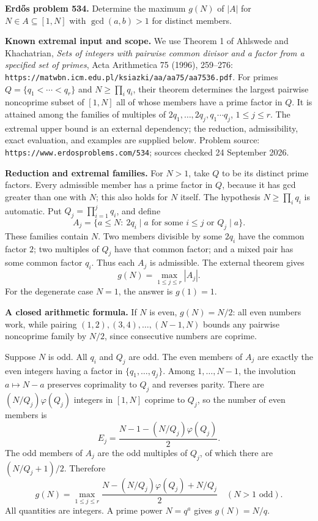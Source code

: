 \textbf{Erd\H{o}s problem 534.}
Determine the maximum $g(N)$ of $|A|$ for $N\in A\subseteq[1,N]$ with $\gcd(a,b)>1$ for distinct members.

\textbf{Known extremal input and scope.}
We use Theorem 1 of Ahlswede and Khachatrian, \emph{Sets of integers with pairwise common divisor and a factor from a specified set of primes}, Acta Arithmetica 75 (1996), 259--276:
\texttt{https://matwbn.icm.edu.pl/ksiazki/aa/aa75/aa7536.pdf}.
For primes $Q=\{q_1<\cdots<q_r\}$ and $N\geq\prod_iq_i$, their theorem determines the largest pairwise noncoprime subset of $[1,N]$ all of whose members have a prime factor in $Q$. It is attained among the families of multiples of
$2q_1,\ldots,2q_j,q_1\cdots q_j$, $1\leq j\leq r$.
The extremal upper bound is an external dependency; the reduction, admissibility, exact evaluation, and examples are supplied below.
Problem source: \texttt{https://www.erdosproblems.com/534}; sources checked 24 September 2026.

\textbf{Reduction and extremal families.}
For $N>1$, take $Q$ to be its distinct prime factors. Every admissible member has a prime factor in $Q$, because it has gcd greater than one with $N$; this also holds for $N$ itself. The hypothesis $N\geq\prod_iq_i$ is automatic.
Put $Q_j=\prod_{i=1}^jq_i$, and define
\[
 A_j=\{a\leq N:\ 2q_i\mid a\text{ for some }i\leq j
                     \text{ or }Q_j\mid a\}.
\]
These families contain $N$. Two members divisible by some $2q_i$ have the common factor $2$; two multiples of $Q_j$ have that common factor; and a mixed pair has some common factor $q_i$. Thus each $A_j$ is admissible. The external theorem gives
\[
 g(N)=\max_{1\leq j\leq r}|A_j|.                         \tag{1}
\]
For the degenerate case $N=1$, the answer is $g(1)=1$.

\textbf{A closed arithmetic formula.}
If $N$ is even, $g(N)=N/2$: all even numbers work, while pairing $(1,2),(3,4),\ldots,(N-1,N)$ bounds any pairwise noncoprime family by $N/2$, since consecutive numbers are coprime.

Suppose $N$ is odd. All $q_i$ and $Q_j$ are odd. The even members of $A_j$ are exactly the even integers having a factor in $\{q_1,\ldots,q_j\}$. Among $1,\ldots,N-1$, the involution $a\mapsto N-a$ preserves coprimality to $Q_j$ and reverses parity. There are
$(N/Q_j)\varphi(Q_j)$ integers in $[1,N]$ coprime to $Q_j$, so the number of even members is
\[
 E_j=\frac{N-1-(N/Q_j)\varphi(Q_j)}2.
\]
The odd members of $A_j$ are the odd multiples of $Q_j$, of which there are $(N/Q_j+1)/2$. Therefore
\[
 \boxed{\quad g(N)=
 \max_{1\leq j\leq r}
 \frac{N-(N/Q_j)\varphi(Q_j)+N/Q_j}{2}\quad(N>1\text{ odd}).\quad} \tag{2}
\]
All quantities are integers. A prime power $N=q^a$ gives $g(N)=N/q$.

